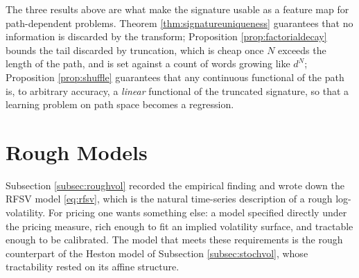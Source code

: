\begin{remark}\label{rem:signaturecalibration}
The three results above are what make the signature usable as a feature map for path-dependent
problems. Theorem \ref{thm:signatureuniqueness} guarantees that no information is discarded by the
transform; Proposition \ref{prop:factorialdecay} bounds the tail discarded by truncation, which is
cheap once $N$ exceeds the length of the path, and is set against a count of words growing like
$d^{N}$; Proposition
\ref{prop:shuffle} guarantees that any continuous functional of the path is, to arbitrary accuracy,
a \emph{linear} functional of the truncated signature, so that a learning problem on path space
becomes a regression. 
\end{remark}




\section{Rough Models}\label{sec:roughvolmodels}

Subsection \ref{subsec:roughvol} recorded the empirical finding and wrote down the RFSV model
\eqref{eq:rfsv}, which is the natural time-series description of a rough log-volatility. For
pricing one wants something else: a model specified directly under the pricing measure, rich enough
to fit an implied volatility surface, and tractable enough to be calibrated. The model that meets
these requirements is the rough counterpart of the Heston model of Subsection
\ref{subsec:stochvol}, whose tractability rested on its affine structure.

